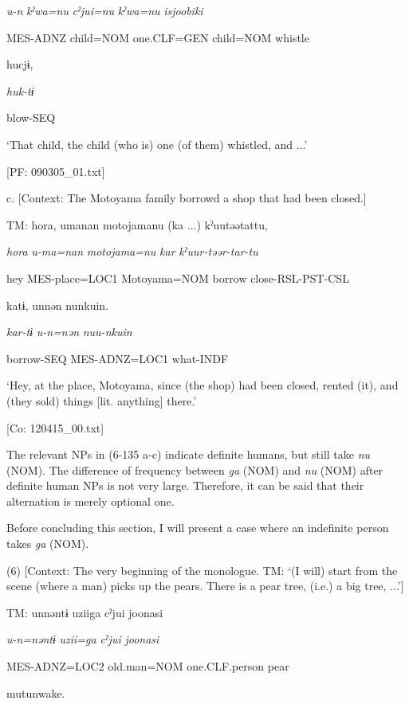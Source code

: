       \textit{u-n}  \textit{kˀwa=nu}  \textit{cˀjui=nu}  \textit{kˀwa=nu}  \textit{isjoobiki}

      MES-ADNZ  child=NOM  one.CLF=GEN  child=NOM  whistle

      hucjɨ,

      \textit{huk-tɨ}

      blow-SEQ

      ‘That child, the child (who is) one (of them) whistled, and ...’

      [PF: 090305\_01.txt]

  c.  [Context: The Motoyama family borrowd a shop that had been closed.]

    TM:  {\textbar}hora{\textbar},  umanan  motojamanu  (ka ...)  kˀuutəətattu,

      \textit{hora}  \textit{u-ma=nan}  \textit{motojama=nu}  \textit{kar}  \textit{kˀuur-təər-tar-tu}

      hey  MES-place=LOC1  Motoyama=NOM  borrow  close-RSL-PST-CSL

      katɨ,  unnən  nunkuin.

      \textit{kar-tɨ}  \textit{u-n=nən}  \textit{nuu-nkuin}

      borrow-SEQ  MES-ADNZ=LOC1  what-INDF

      ‘Hey, at the place, Motoyama, since (the shop) had been closed, rented (it), and (they sold) things [lit. anything] there.’

      [Co: 120415\_00.txt]

The relevant NPs in (6-135 a-c) indicate definite humans, but still take \textit{nu} (NOM). The difference of frequency between \textit{ga} (NOM) and \textit{nu} (NOM) after definite human NPs is not very large. Therefore, it can be said that their alternation is merely optional one.

  Before concluding this section, I will present a case where an indefinite person takes \textit{ga} (NOM).

(6)  [Context: The very beginning of the monologue. TM: ‘(I will) start from the scene (where a man) picks up the pears. There is a pear tree, (i.e.) a big tree, ...’]

  TM:  unnəntɨ  uziiga  cˀjui  joonasi

    \textit{u-n=nəntɨ}  \textit{uzii=ga}  \textit{cˀjui}  \textit{joonasi}

    MES-ADNZ=LOC2  old.man=NOM  one.CLF.person  pear

    mutunwake.

